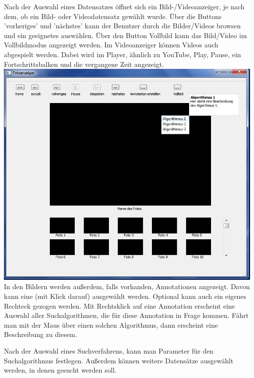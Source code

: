 Nach der Auswahl eines Datensatzes öffnet sich ein Bild-/Videoanzeiger, je nach dem, ob ein Bild- oder Videodatensatz gewählt wurde. Über die Buttons 'vorheriges' und 'nächstes' kann der Benutzer durch die Bilder/Videos browsen und ein geeignetes auswählen. Über den Button Vollbild kann das Bild/Video im Vollbildmodus angezeigt werden. Im Videoanzeiger können Videos auch abgespielt werden. Dabei wird im Player, ähnlich zu YouTube, Play, Pause, ein Fortschrittsbalken und die vergangene Zeit angezeigt. 
\includegraphics[width=1\linewidth]{img/Fotoanzeiger}
In den Bildern werden außerdem, falls vorhanden, Annotationen angezeigt. Davon kann eine (mit Klick darauf) ausgewählt werden. Optional kann auch ein eigenes Rechteck gezogen werden. Mit Rechtsklick auf eine Annotation erscheint eine Auswahl aller Suchalgorithmen, die für diese Annotation in Frage kommen. Fährt man mit der Maus über einen solchen Algorithmus, dann erscheint eine Beschreibung zu diesem.

Nach der Auswahl eines Suchverfahrens, kann man Parameter für den Suchalgorithmus festlegen. Außerdem können weitere Datensätze ausgewählt werden, in denen gesucht werden soll.

